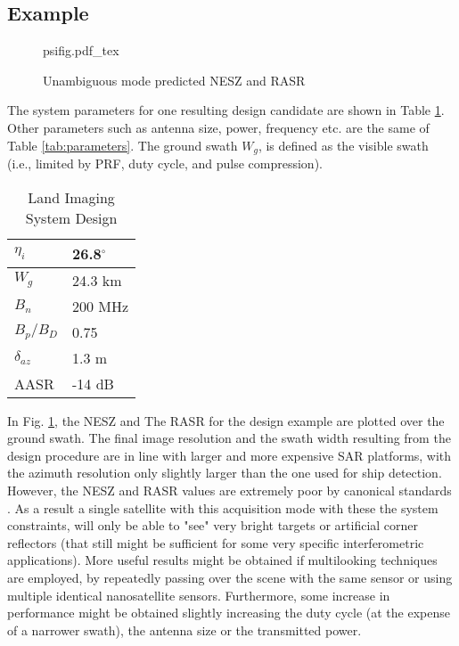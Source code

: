 \documentclass[conference,a4paper]{IEEEtran}
\begin{document}
    \subsection{Example}
    \label{subsec:psiexample}
        \begin{figure}[ht]
        \centering
        \begin{normalsize}
                {psifig.pdf_tex}
        \end{normalsize}
        \caption{Unambiguous mode predicted NESZ and RASR}
        \label{fig:eucap}
    \end{figure}
    The system parameters for one resulting design candidate are shown in Table \ref{tab:psi}.
    Other parameters such as antenna size, power, frequency etc. are the same of Table \ref{tab:parameters}.
    The ground swath $W_g$, is defined as the visible swath (i.e., limited by PRF, duty cycle, and pulse compression).
    \begin{table}[h]
        \caption{Land Imaging System Design}
        \label{tab:psi}
        \centering
        \begin{tabular}{|l|l|}
            \hline
            $\eta_i$          & 26.8$^\circ$ \\ \hline
            $W_g$         &  24.3 km          \\ \hline
            $B_n$             & 200 MHz    \\ \hline
            $B_p/B_D$         & 0.75           \\ \hline
            $\delta_{az}$     &1.3 m        \\ \hline
            AASR         &-14 dB           \\ \hline
        \end{tabular}
    \end{table}

    In Fig. \ref{fig:eucap}, the NESZ and The RASR for the design example are plotted over the ground swath.
    The final image resolution and the swath width resulting from the design procedure are in line with larger and more expensive SAR platforms, with the azimuth resolution only slightly larger than the one used for ship detection.
    However, the NESZ and RASR values are extremely poor by canonical standards \cite{curlander1991synthetic}.
    As a result a single satellite with this acquisition mode with these the system constraints, will only be able to "see" very bright targets or artificial corner reflectors (that still might be sufficient for some very specific interferometric applications).
    More useful results might be obtained if multilooking techniques \cite{curlander1991synthetic,moreira_tutorial} are employed, by repeatedly passing over the scene with the same sensor or using multiple identical nanosatellite sensors.
    Furthermore, some increase in performance might be obtained slightly increasing the duty cycle (at the expense of a narrower swath), the antenna size or the transmitted power.
\end{document}
